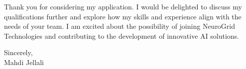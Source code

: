 \documentclass[letterpaper,11pt]{article}
\begin{document}
    Thank you for considering my application. I would be delighted to discuss my qualifications further and explore how my skills and experience align with the needs of your team. I am excited about the possibility of joining NeuroGrid Technologies and contributing to the development of innovative AI solutions.

    Sincerely,\\[12pt]

    Mahdi Jellali
\end{document}
